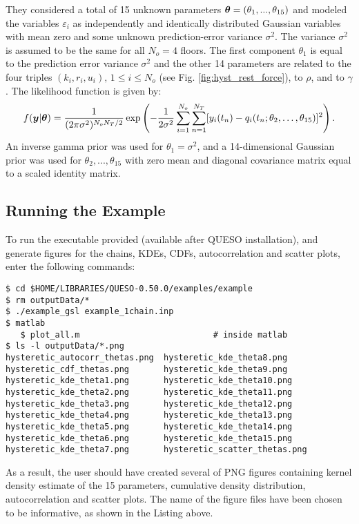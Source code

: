 They considered a total of 15 unknown parameters $\mbox{\boldmath$ \theta $} = (\theta_1 , . . . , \theta_{15})$ and modeled the variables $\varepsilon_i$ as independently and identically distributed Gaussian variables with mean zero and some unknown prediction-error variance $\sigma^2$. The variance $\sigma^2$ is assumed to be the same for all $N_o = 4$ floors.  The first component $\theta_1$ is equal to the prediction error variance $\sigma^2$ and the other 14 parameters are related to the four triples $(k_i, r_i, u_i),\, 1 \leq i \leq N_o$ (see Fig. \ref{fig:hyst_rest_force}), to $\rho$, and to $\gamma$. The likelihood function is given by:
\begin{equation}\label{eq:hyst:like}
 f(\mbox{\boldmath$ y $}|\mbox{\boldmath$ \theta $}) = \dfrac{1}{(2 \pi \sigma^2)^{N_oN_T/2}}\exp \left( -\dfrac{1}{2\sigma^2} \displaystyle \sum_{i=1}^{N_o} \sum_{n=1}^{N_T} [y_i(t_n) - {q}_i(t_n; \theta_2,\ldots,\theta_{15})]^2 \right).
\end{equation}
An inverse gamma  prior was used for $\theta_1=\sigma^2$, and a 14-dimensional Gaussian prior was used for $\theta_2 , ..., \theta_{15}$ with zero mean and diagonal covariance matrix equal to a scaled identity matrix.


\subsection{Running the Example}\label{sec:hysteretic-run}

To run the executable provided (available after QUESO installation), and generate figures for the chains, KDEs, CDFs, autocorrelation and scatter plots, enter the following commands:
\begin{lstlisting}[label={},caption={}]
$ cd $HOME/LIBRARIES/QUESO-0.50.0/examples/example
$ rm outputData/*
$ ./example_gsl example_1chain.inp    
$ matlab
   $ plot_all.m	                          # inside matlab   
$ ls -l outputData/*.png
hysteretic_autocorr_thetas.png  hysteretic_kde_theta8.png 
hysteretic_cdf_thetas.png       hysteretic_kde_theta9.png
hysteretic_kde_theta1.png       hysteretic_kde_theta10.png
hysteretic_kde_theta2.png       hysteretic_kde_theta11.png
hysteretic_kde_theta3.png       hysteretic_kde_theta12.png
hysteretic_kde_theta4.png       hysteretic_kde_theta13.png
hysteretic_kde_theta5.png       hysteretic_kde_theta14.png
hysteretic_kde_theta6.png       hysteretic_kde_theta15.png
hysteretic_kde_theta7.png       hysteretic_scatter_thetas.png
\end{lstlisting}


As a result, the user should have created several of PNG figures containing kernel density estimate of the 15 parameters, cumulative density distribution, autocorrelation and scatter plots. The name of the figure files have been chosen to be informative, as shown in the Listing above.

